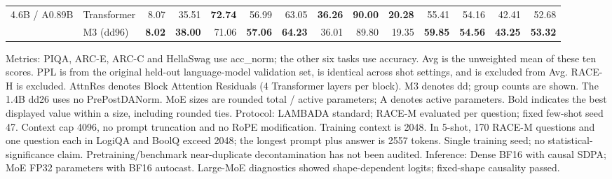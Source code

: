 \documentclass{article}
\begin{document}
\begin{table}[p]
{\begin{tabular}{llrrrrrrrrrrrr}
\midrule
4.6B / A0.89B & Transformer & 8.07 & 35.51 & \textbf{72.74} & 56.99 & 63.05 & \textbf{36.26} & \textbf{90.00} & \textbf{20.28} & 55.41 & 54.16 & 42.41 & 52.68 \\
 & M3 (dd96) & \textbf{8.02} & \textbf{38.00} & 71.06 & \textbf{57.06} & \textbf{64.23} & 36.01 & 89.80 & 19.35 & \textbf{59.85} & \textbf{54.56} & \textbf{43.25} & \textbf{53.32} \\
\bottomrule
\end{tabular}}
\par\smallskip\footnotesize\raggedright
Metrics: PIQA, ARC-E, ARC-C and HellaSwag use acc_norm; the other six tasks use accuracy. Avg is the unweighted mean of these ten scores. PPL is from the original held-out language-model validation set, is identical across shot settings, and is excluded from Avg. RACE-H is excluded. AttnRes denotes Block Attention Residuals (4 Transformer layers per block). M3 denotes dd; group counts are shown. The 1.4B dd26 uses no PrePostDANorm. MoE sizes are rounded total / active parameters; A denotes active parameters. Bold indicates the best displayed value within a size, including rounded ties. Protocol: LAMBADA standard; RACE-M evaluated per question; fixed few-shot seed 47. Context cap 4096, no prompt truncation and no RoPE modification. Training context is 2048. In 5-shot, 170 RACE-M questions and one question each in LogiQA and BoolQ exceed 2048; the longest prompt plus answer is 2557 tokens. Single training seed; no statistical-significance claim. Pretraining/benchmark near-duplicate decontamination has not been audited. Inference: Dense BF16 with causal SDPA; MoE FP32 parameters with BF16 autocast. Large-MoE diagnostics showed shape-dependent logits; fixed-shape causality passed.
\end{table}
\clearpage
\end{document}
